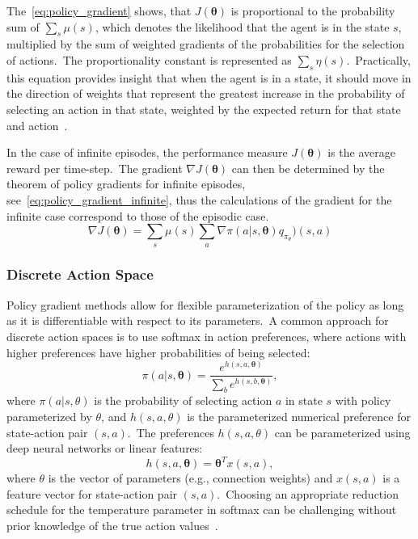 \documentclass[../xlapes02]{subfiles}
\begin{document}
    The~\cref{eq:policy_gradient} shows, that $J(\bm{\theta})$ is proportional to the probability sum of $\sum_s \mu(s)$, which denotes the likelihood that the agent is in the state $s$, multiplied by the sum of weighted gradients of the probabilities for the selection of actions.\ The proportionality constant is represented as $\sum_s \eta(s)$.\ Practically, this equation provides insight that when the agent is in a state, it should move in the direction of weights that represent the greatest increase in the probability of selecting an action in that state, weighted by the expected return for that state and action~\cite{FITMT25127}.

    In the case of infinite episodes, the performance measure $J(\bm{\theta})$ is the average reward per time-step.\ The gradient $\nabla J(\bm{\theta})$ can then be determined by the theorem of policy gradients for infinite episodes, see~\cref{eq:policy_gradient_infinite}, thus the calculations of the gradient for the infinite case correspond to those of the episodic case.
    \begin{equation}
        \label{eq:policy_gradient_infinite}
        \nabla J(\bm{\theta})=\sum_s\mu(s)\sum_a\nabla\pi(a|s,\bm{\theta})q_{\pi_\theta})(s,a)
    \end{equation}

    \subsubsection{Discrete Action Space}
    Policy gradient methods allow for flexible parameterization of the policy as long as it is differentiable with respect to its parameters.\ A common approach for discrete action spaces is to use softmax in action preferences, where actions with higher preferences have higher probabilities of being selected:
    \begin{equation}
        \label{eq:softmax}
        \pi(a|s, \bm{\theta}) = \frac{e^{h(s,a,\bm{\theta})}}{\sum_b e^{h(s,b,\bm{\theta})}} ,
    \end{equation}
    where $\pi(a|s, \theta)$ is the probability of selecting action $a$ in state $s$ with policy parameterized by $\theta$, and $h(s,a,\theta)$ is the parameterized numerical preference for state-action pair $(s,a)$.\ The preferences $h(s,a,\theta)$ can be parameterized using deep neural networks or linear features:
    \begin{equation}
        \label{eq:softmax_linear}
        h(s,a,\bm{\theta}) = \bm{\theta}^T x(s,a) ,
    \end{equation}
    where $\theta$ is the vector of parameters (e.g., connection weights) and $x(s,a)$ is a feature vector for state-action pair $(s,a)$.\ Choosing an appropriate reduction schedule for the temperature parameter in softmax can be challenging without prior knowledge of the true action values~\cite{sutton2018reinforcement}.
\end{document}
